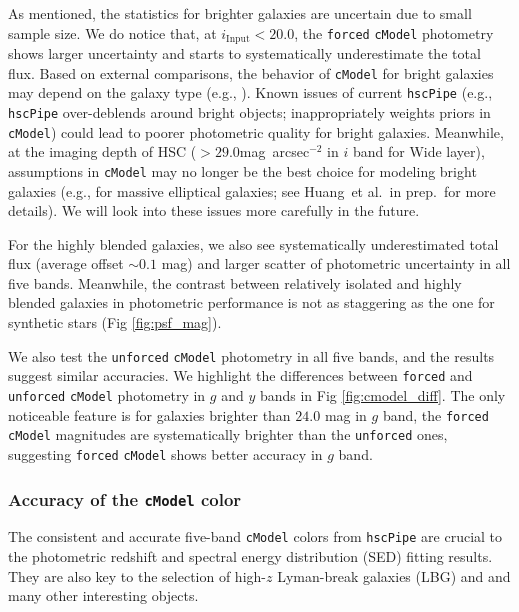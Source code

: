 \documentclass[useamsfonts]{pasj01}
\def\sb{mag~arcsec$^{-2}$}
\def\etal{{\ et al.~}}
\def\hscpipe{\texttt{hscPipe}}
\def\cmodel{\texttt{cModel}}
\def\forced{\texttt{forced}}
\def\unforced{\texttt{unforced}}
\begin{document}
    As mentioned, the statistics for brighter galaxies are uncertain due to small 
    sample size.
    We do notice that, at $i_{\mathrm{Input}}<20.0$, the \forced{} \cmodel{} photometry 
    shows larger uncertainty and starts to systematically underestimate the total flux.
    Based on external comparisons, the behavior of \cmodel{} for bright galaxies may 
    depend on the galaxy type (e.g., \citealt{HSCDR1}). 
    Known issues of current \hscpipe{} (e.g., \hscpipe{} over-deblends around bright 
    objects; inappropriately weights priors in \cmodel{}) could lead to poorer 
    photometric quality for bright galaxies. 
    Meanwhile, at the imaging depth of HSC ($>29.0$\sb{} in $i$ band for Wide layer), 
    assumptions in \cmodel{} may no longer be the best choice for modeling bright 
    galaxies (e.g., for massive elliptical galaxies; see Huang\etal in prep.~for 
    more details).
    We will look into these issues more carefully in the future.

    For the highly blended galaxies, we also see systematically underestimated total 
    flux (average offset ${\sim}0.1$ mag) and larger scatter of photometric 
    uncertainty in all five bands.
    Meanwhile, the contrast between relatively isolated and highly blended galaxies
    in photometric performance is not as staggering as the one for synthetic
    stars (Fig \ref{fig:psf_mag}).

    We also test the \unforced{} \cmodel{} photometry in all five bands, and the
    results suggest similar accuracies.
    We highlight the differences between \forced{} and \unforced{} \cmodel{}
    photometry in $g$ and $y$ bands in Fig \ref{fig:cmodel_diff}.
    The only noticeable feature is for galaxies brighter than $24.0$ mag in
    $g$ band, the \forced{} \cmodel{} magnitudes are systematically brighter than
    the \unforced{} ones, suggesting \forced{} \cmodel{} shows better accuracy in 
    $g$ band.

\subsubsection{Accuracy of the \cmodel{} color}

    The consistent and accurate five-band \cmodel{} colors from \hscpipe{} are crucial
    to the photometric redshift and spectral energy distribution (SED) fitting results.
    They are also key to the selection of high-$z$ Lyman-break galaxies (LBG) and
    and many other interesting objects.
\end{document}
